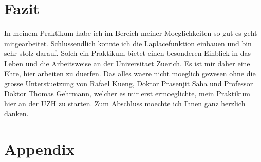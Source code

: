 \documentclass[pdftex,12pt,a4paper]{article}
\begin{document}
\section{Fazit}
In meinem Praktikum habe ich im Bereich meiner Moeglichkeiten so gut es geht mitgearbeitet.
Schlussendlich konnte ich die Laplacefunktion einbauen und bin sehr stolz darauf.
Solch ein Praktikum bietet einen besonderen Einblick in das Leben und die Arbeitsweise an der Universitaet Zuerich.
Es ist mir daher eine Ehre, hier arbeiten zu duerfen.
Das alles waere nicht moeglich gewesen ohne die grosse Unterstuetzung von Rafael Kueng, Doktor Prasenjit Saha und Professor Doktor Thomas Gehrmann,
welcher es mir erst ermoeglichte, mein Praktikum hier an der UZH zu starten.
Zum Abschluss moechte ich Ihnen ganz herzlich danken.

\section{Appendix}
\end{document}
